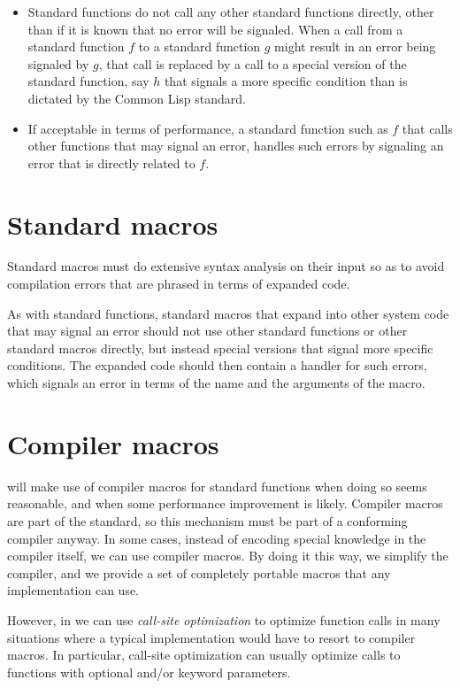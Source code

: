 \begin{itemize}
\item Standard functions do not call any other standard functions
  directly, other than if it is known that no error will be signaled.
  When a call from a standard function $f$ to a standard function $g$
  might result in an error being signaled by $g$, that call is
  replaced by a call to a special version of the standard function,
  say $h$ that signals a more specific condition than is dictated by
  the Common Lisp standard.
\item If acceptable in terms of performance, a standard function such
  as $f$ that calls other functions that may signal an error, handles
  such errors by signaling an error that is directly related to $f$.

\end{itemize}

\section{Standard macros}

Standard macros must do extensive syntax analysis on their input so as
to avoid compilation errors that are phrased in terms of expanded
code.

As with standard functions, standard macros that expand into other
system code that may signal an error should not use other standard
functions or other standard macros directly, but instead special
versions that signal more specific conditions.  The expanded code
should then contain a handler for such errors, which signals an error
in terms of the name and the arguments of the macro.

\section{Compiler macros}

{\sysname} will make use of compiler macros for standard functions
when doing so seems reasonable, and when some performance improvement
is likely.  Compiler macros are part of the standard, so this
mechanism must be part of a conforming compiler anyway.  In some
cases, instead of encoding special knowledge in the compiler itself,
we can use compiler macros.  By doing it this way, we simplify the
compiler, and we provide a set of completely portable macros that any
implementation can use.

However, in \sysname{} we can use \emph{call-site optimization} to
optimize function calls in many situations where a typical
\commonlisp{} implementation would have to resort to compiler macros.
In particular, call-site optimization can usually optimize calls to
functions with optional and/or keyword parameters.

